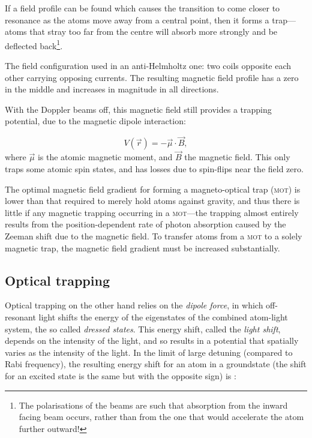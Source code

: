 If a field profile can be found which causes the transition to come closer to resonance as the atoms move away from a central point, then it forms a trap---atoms  that stray too far from the centre will absorb more strongly and be deflected back\footnote{The polarisations of the beams are such that absorption from the inward facing beam occurs, rather than from the one that would accelerate the atom further outward!}.

The field configuration used in an anti-Helmholtz one: two coils opposite each other carrying opposing currents. The resulting magnetic field profile has a zero in the middle and increases in magnitude in all directions.

With the Doppler beams off, this magnetic field still provides a trapping potential, due to the magnetic dipole interaction:

\begin{equation}
V(\vec{r}) = -\vec \mu \cdot \vec B,
\end{equation}
where $\vec\mu$ is the atomic magnetic moment, and $\vec B$ the magnetic field. This only traps some atomic spin states, and has losses due to spin-flips \cite{brink_majorana_2006} near the field zero.

The optimal magnetic field gradient for forming a magneto-optical trap (\textsc{mot}) is lower than that required to merely hold atoms against gravity, and thus there is little if any magnetic trapping occurring in a \textsc{mot}---the trapping almost entirely results from the position-dependent rate of photon absorption caused by the Zeeman shift due to the magnetic field. To transfer atoms from a \textsc{mot} to a solely magnetic trap, the magnetic field gradient must be increased substantially.

\subsection{Optical trapping}

Optical trapping on the other hand relies on the \emph{dipole force}, in which off-resonant light shifts the energy of the eigenstates of the combined atom-light system, the so called \emph{dressed states}. This energy shift, called the \emph{light shift}, depends on the intensity of the light, and so results in a potential that spatially varies as the intensity of the light. In the limit of large detuning (compared to Rabi frequency), the resulting energy shift for an atom in a groundstate (the shift for an excited state is the same but with the opposite sign) is \cite[p 8]{metcalf_laser_1999}:

